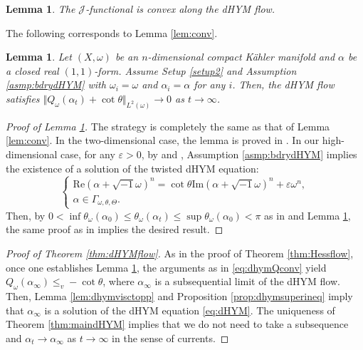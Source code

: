 \documentclass{amsart}
\numberwithin{equation}{section}
\theoremstyle{plain}
\newtheorem{lem}[equation]{Lemma}
\theoremstyle{definition}
\theoremstyle{remark}
\begin{document}
\begin{lem}\label{lem:dhymconvexalongflow}
    The $\mathcal{J}$-functional is convex along the dHYM flow.
\end{lem}

 The following corresponds to Lemma \ref{lem:conv}.
 
\begin{lem}\label{lem:dhymconv}
    Let $(X,\omega)$ be an $n$-dimensional compact Kähler manifold and $\alpha$ be a closed real $(1,1)$-form. Assume Setup \ref{setup2} and Assumption \ref{asmp:bdrydHYM} with $\omega_i=\omega$ and $\alpha_i=\alpha$ for any $i$. Then, the dHYM flow satisfies $\Vert Q_\omega(\alpha_t)+\cot\theta\Vert_{L^2(\omega)}\to0$ as $t\to\infty$.
\end{lem}

\begin{proof}[Proof of Lemma \ref{lem:dhymconv}]
     The strategy is completely the same as that of Lemma \ref{lem:conv}. In the two-dimensional case, the lemma is proved in \cite[Proposition 3.3]{Mur}. In our high-dimensional case, for any $\varepsilon>0$, by \cite{Linb} and \cite[Proposition 5.5]{GChen}, Assumption \ref{asmp:bdrydHYM} implies the existence of a solution of the twisted dHYM equation:
\begin{equation*}
    \begin{cases}
        \mathrm{Re}(\alpha+\sqrt{-1}\omega)^n=\cot\theta\mathrm{Im}(\alpha+\sqrt{-1}\omega)^n+\varepsilon\omega^n,\\
        \alpha\in\Gamma_{\omega,\theta,\Theta}.
    \end{cases}
\end{equation*}
Then, by $0<\inf\theta_\omega(\alpha_0)\le\theta_\omega(\alpha_t)\le\sup\theta_\omega(\alpha_0)<\pi$ as in \cite[Lemma 3.2]{FYZ} and Lemma \ref{lem:dhymconvexalongflow}, the same proof as in \cite[Proposition 3.3]{Mur} implies the desired result.
\end{proof}

\begin{proof}[Proof of Theorem \ref{thm:dHYMflow}]
    As in the proof of Theorem \ref{thm:Hessflow}, once one establishes Lemma \ref{lem:dhymconv}, the arguments as in \eqref{eq:dhymQconv} yield $Q_\omega(\alpha_\infty)\le_v-\cot\theta$, where $\alpha_\infty$ is a subsequential limit of the dHYM flow. Then, Lemma \ref{lem:dhymvisctopp} and Proposition \ref{prop:dhymsuperineq} imply that $\alpha_\infty$ is a solution of the dHYM equation \eqref{eq:dHYM}. The uniqueness of Theorem \ref{thm:maindHYM} implies that we do not need to take a subsequence and $\alpha_t\to\alpha_\infty$ as $t\to\infty$ in the sense of currents.
\end{proof}
\end{document}
